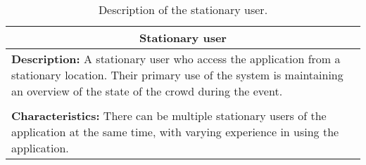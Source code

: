 \begin{table}[h!]
    \centering
    \begin{tabularx}{/4}{X}
        \toprule
        \multicolumn{1}{c}{\textbf{Stationary user}} \\ 
        \midrule
        \textbf{Description:} A stationary user who access the application from a stationary location. Their primary use of the system is maintaining an overview of the state of the crowd during the event. \\
        \\
        \textbf{Characteristics:} There can be multiple stationary users of the application at the same time, with varying experience in using the application. \\
        \bottomrule
    \end{tabularx}
    \caption{Description of the stationary user.}
    \label{tab:stat_user}
\end{table}
